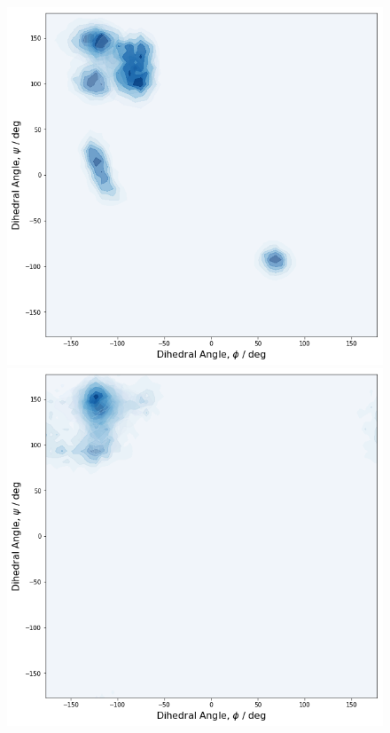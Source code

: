 \documentclass{article}[12pt]
\numberwithin{equation}{section}
\begin{document}
\begin{figure}[H]
	\centering{}
	\captionsetup{justification=centering}
	\includegraphics[scale=0.3]{dihedrals-1}
	\includegraphics[scale=0.3]{dihedrals-2}

\end{figure}
\end{document}
